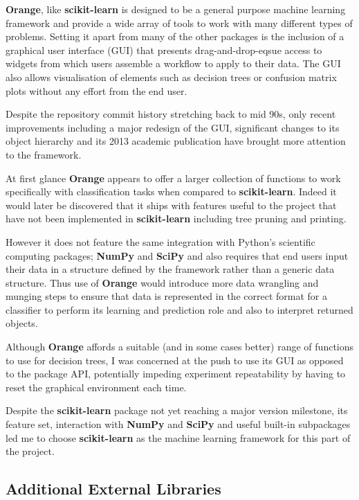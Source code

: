 \textbf{Orange}, like \textbf{scikit-learn} is designed to be a general purpose
machine learning framework and provide a wide array of tools to work with many
different types of problems. Setting it apart from many of the other packages is
the inclusion of a graphical user interface (GUI) that presents
drag-and-drop-eqsue access to widgets from which users assemble a workflow to
apply to their data. The GUI also allows visualisation of elements such as
decision trees or confusion matrix plots without any effort from the end user.

Despite the repository commit history stretching back to mid 90s, only recent
improvements including a major redesign of the GUI, significant changes to
its object hierarchy and its 2013 academic publication have brought more
attention to the framework.

At first glance \textbf{Orange} appears to offer a larger collection of
functions to work specifically with classification tasks when compared to
\textbf{scikit-learn}. Indeed it would later be discovered that it ships with
features useful to the project that have not been implemented in
\textbf{scikit-learn} including tree pruning and printing.

However it does not feature the same integration with
Python's scientific computing packages; \textbf{NumPy} and \textbf{SciPy} and
also requires that end users input their data in a structure defined by
the framework rather than a generic data structure.
Thus use of \textbf{Orange} would introduce more data wrangling and munging
steps to ensure that data is represented in the correct format for a classifier
to perform its learning and prediction role and also to interpret returned objects.

Although \textbf{Orange} affords a suitable (and in some cases better) range of
functions to use for decision trees, I was concerned at the push to use its GUI
as opposed to the package API, potentially impeding experiment repeatability by
having to reset the graphical environment each time.

Despite the \textbf{scikit-learn} package not yet reaching a major version
milestone, its feature set, interaction with \textbf{NumPy} and \textbf{SciPy}
and useful built-in subpackages led me to choose \textbf{scikit-learn} as the
machine learning framework for this part of the project.


\subsection{Additional External Libraries}
\label{sec:additional-libs}

